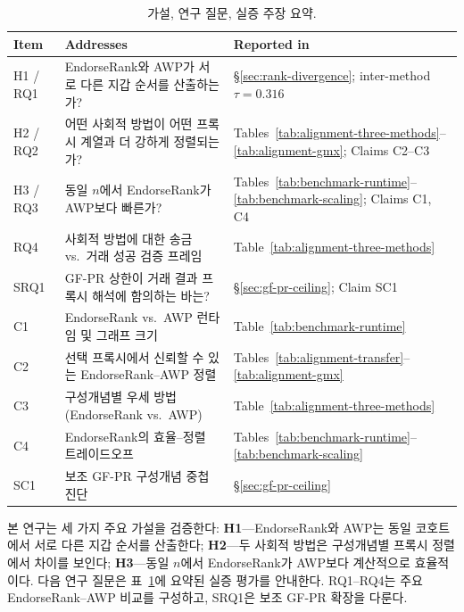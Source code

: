 \begin{table}[htbp]
\centering
\caption{가설, 연구 질문, 실증 주장 요약.}
\label{tab:hrq-claim-map}
\begin{tabular}{p{1.5cm}p{6.0cm}p{5.6cm}}
\toprule
Item & Addresses & Reported in \\
\midrule
H1 / RQ1 & EndorseRank와 AWP가 서로 다른 지갑 순서를 산출하는가? & \S\ref{sec:rank-divergence}; inter-method $\tau=0.316$ \\
H2 / RQ2 & 어떤 사회적 방법이 어떤 프록시 계열과 더 강하게 정렬되는가? & Tables~\ref{tab:alignment-three-methods}--\ref{tab:alignment-gmx}; Claims C2--C3 \\
H3 / RQ3 & 동일 $n$에서 EndorseRank가 AWP보다 빠른가? & Tables~\ref{tab:benchmark-runtime}--\ref{tab:benchmark-scaling}; Claims C1, C4 \\
RQ4 & 사회적 방법에 대한 송금 vs.\ 거래 성공 검증 프레임 & Table~\ref{tab:alignment-three-methods} \\
SRQ1 & GF-PR 상한이 거래 결과 프록시 해석에 함의하는 바는? & \S\ref{sec:gf-pr-ceiling}; Claim SC1 \\
C1 & EndorseRank vs.\ AWP 런타임 및 그래프 크기 & Table~\ref{tab:benchmark-runtime} \\
C2 & 선택 프록시에서 신뢰할 수 있는 EndorseRank--AWP 정렬 & Tables~\ref{tab:alignment-transfer}--\ref{tab:alignment-gmx} \\
C3 & 구성개념별 우세 방법 (EndorseRank vs.\ AWP) & Table~\ref{tab:alignment-three-methods} \\
C4 & EndorseRank의 효율--정렬 트레이드오프 & Tables~\ref{tab:benchmark-runtime}--\ref{tab:benchmark-scaling} \\
SC1 & 보조 GF-PR 구성개념 중첩 진단 & \S\ref{sec:gf-pr-ceiling} \\
\bottomrule
\end{tabular}
\end{table}


본 연구는 세 가지 주요 가설을 검증한다: \textbf{H1}---EndorseRank와 AWP는 동일 코호트에서 서로 다른 지갑 순서를 산출한다; \textbf{H2}---두 사회적 방법은 구성개념별 프록시 정렬에서 차이를 보인다; \textbf{H3}---동일 $n$에서 EndorseRank가 AWP보다 계산적으로 효율적이다. 다음 연구 질문은 표~\ref{tab:hrq-claim-map}에 요약된 실증 평가를 안내한다. RQ1--RQ4는 주요 EndorseRank--AWP 비교를 구성하고, SRQ1은 보조 GF-PR 확장을 다룬다.

